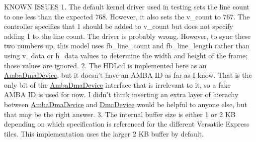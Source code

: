 KNOWN ISSUES 1. The default kernel driver used in testing sets the line count to one less than the expected 768. However, it also sets the v\_\-count to 767. The controller specifies that 1 should be added to v\_\-count but does not specify adding 1 to the line count. The driver is probably wrong. However, to sync these two numbers up, this model uses fb\_\-line\_\-count and fb\_\-line\_\-length rather than using v\_\-data or h\_\-data values to determine the width and height of the frame; those values are ignored. 2. The \hyperlink{classHDLcd}{HDLcd} is implemented here as an \hyperlink{classAmbaDmaDevice}{AmbaDmaDevice}, but it doesn't have an AMBA ID as far as I know. That is the only bit of the \hyperlink{classAmbaDmaDevice}{AmbaDmaDevice} interface that is irrelevant to it, so a fake AMBA ID is used for now. I didn't think inserting an extra layer of hierachy between \hyperlink{classAmbaDmaDevice}{AmbaDmaDevice} and \hyperlink{classDmaDevice}{DmaDevice} would be helpful to anyone else, but that may be the right answer. 3. The internal buffer size is either 1 or 2 KB depending on which specification is referenced for the different Versatile Express tiles. This implementation uses the larger 2 KB buffer by default. 